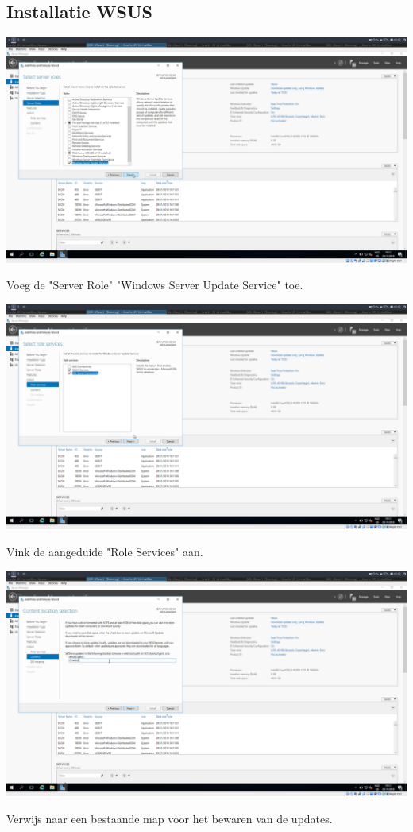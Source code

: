 \documentclass[a4paper]{article}
\begin{document}
\subsection{Installatie WSUS}
\begin{center}
	\includegraphics[width=15cm]{Pictures/SCCM/5/1543504348.png}
	
	Voeg de "Server Role" "Windows Server Update Service" toe.
\end{center}
\begin{center}
	\includegraphics[width=15cm]{Pictures/SCCM/5/1543504358.png}
	
	Vink de aangeduide "Role Services" aan. 
\end{center}
\begin{center}
	\includegraphics[width=15cm]{Pictures/SCCM/5/1543504368.png}
	
	Verwijs naar een bestaande map voor het bewaren van de updates.
\end{center}
\end{document}
